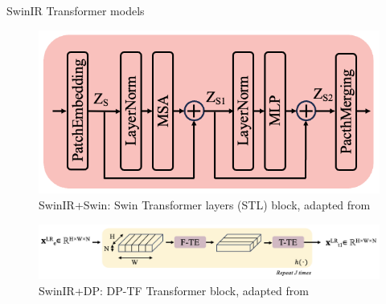 \documentclass{beamer}
\begin{document}
\begin{frame}[t]{SwinIR Transformer models}
    
    \begin{figure}
        \centering
        \hspace{-0.2cm}
        \includegraphics[scale=.55]{MA_presentation/figures/stl_block.png}
        \caption{SwinIR+Swin: Swin Transformer layers (STL) block, adapted from \cite{liang_swinir_2021}}
    \end{figure}


    \begin{figure}
        \centering
        \includegraphics[scale=.47]{MA_presentation/figures/dp_transformer_block.png}
        \caption{SwinIR+DP: DP-TF Transformer block, adapted from \cite{hinderer_blind_2022}}
    \end{figure}

\end{frame}
\end{document}
